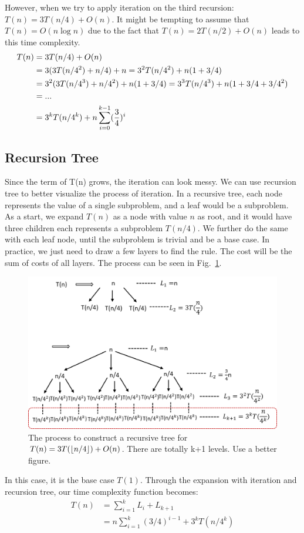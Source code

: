 \documentclass[../main.tex]{subfiles}
\begin{document}
However, when we try to apply iteration on the third recursion:  $T(n)=3T(n/4)+O(n)$. It might be tempting to assume that $T(n)=O(n\log n)$ due to the fact that $T(n)=2T(n/2)+O(n)$ leads to this time complexity.
\begin{align}
\label{complexity_non_overlap_1}
    T(n)&=3T(n/4)+O(n)\\
    &=3(3T(n/4^2)+n/4)+n=3^2T(n/4^2)+n(1+3/4)\notag\\
    &=3^2(3T(n/4^3)+n/4^2)+n(1+3/4)=3^3T(n/4^3)+n(1+3/4+3/4^2)\\
    &=...\\
    &=3^kT(n/4^k)+n\sum_{i=0}^{k-1}(\frac{3}{4})^{i}
\end{align}
\subsection{Recursion Tree}
Since the term of T(n) grows, the iteration can look messy. We can use recursion tree to better visualize the process of iteration. In a recursive tree, each node represents the value of a single subproblem, and a leaf would be a subproblem. As a start, we expand $T(n)$ as a node with value $n$ as root, and it would have three children each represents a subproblem $T(n/4)$. We further do the same with each leaf node, until the subproblem is trivial and be a base case. In practice, we just need to draw a few layers to find the rule. The cost will be the sum of costs of all layers.  The process can be seen in  Fig.~\ref{fig:recursive_tree}. 
\begin{figure}[!ht]
    \centering
    \includegraphics[width=0.98\columnwidth]{fig/recursion_tree_non_overlap.png}
    \caption{The process to construct a recursive tree for $T(n) = 3T(\floor*{n/4}) + O(n)$. There are totally k+1 levels. Use a better figure.  }
    \label{fig:recursive_tree}
\end{figure}
 In this case, it is the base case $T(1)$. Through the expansion with iteration and recursion tree, our time complexity function becomes:
\begin{align}
\label{complexity_non_overlap_2}
    T(n)&=\sum_{i=1}^{k}L_i + L_{k+1}\\
    &=n\sum_{i=1}^{k}(3/4)^{i-1}+3^kT(n/4^k)
\end{align}
\end{document}
